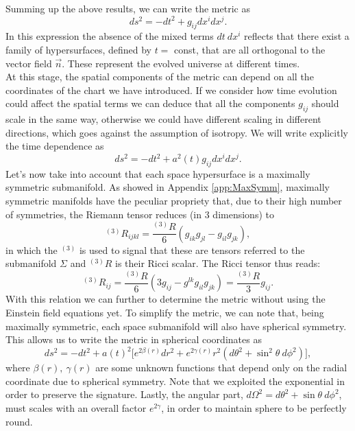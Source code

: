 Summing up the above results, we can write the metric as
\begin{equation*}
    ds^2=-dt^2+g_{ij}dx^i dx^j.
\end{equation*}
In this expression the absence of the mixed terms $dt\ dx^i$ reflects that there exist a family of hypersurfaces, defined by $t=$ const, that are all orthogonal to the vector field $\vec n$. These represent the evolved universe at different times.\\
At this stage, the spatial components of the metric can depend on all the coordinates of the chart we have introduced. If we consider how time evolution could affect the spatial terms we can deduce that all the components $g_{ij}$ should scale in the same way, otherwise we could have different scaling in different directions, which goes against the assumption of isotropy. We will write explicitly the time dependence as
\begin{equation*}
    ds^2=-dt^2+a^2(t)g_{ij}dx^i dx^j.
\end{equation*} 
Let's now take into account that each space hypersurface is a maximally symmetric submanifold. 
As showed in Appendix \ref{app:MaxSymm}, maximally symmetric manifolds have the peculiar propriety that, due to their high number of symmetries, the Riemann tensor reduces (in 3 dimensions) to 
\begin{equation*}
    ^{(3)}R_{ijkl}=\frac{^{(3)}R}{6}(g_{ik}g_{jl}-g_{il}g_{jk}),
\end{equation*}
in which the $^{(3)}$ is used to signal that these are tensors referred to the submanifold $\Sigma$ and $^{(3)}R$ is their Ricci scalar. The Ricci tensor thus reads:
\begin{equation}\label{maxsymRicci}
    ^{(3)}R_{ij}=\frac{^{(3)}R}{6}(3g_{ij}-g^{lk}g_{il}g_{jk})=\frac{^{(3)}R}{3}g_{ij}.
\end{equation}
With this relation we can further to determine the metric without using the Einstein field equations yet.
To simplify the metric, we can note that, being maximally symmetric, each space submanifold will also have spherical symmetry. This allows us to write the metric in spherical coordinates as
\begin{equation*}
    ds^2=-dt^2+a(t)^2\big[e^{2\beta(r)}dr^2+e^{2\gamma(r)}r^2(d\theta^2+\sin^2\theta\ d\phi^2)\big],
\end{equation*}  
where $\beta(r),\ \gamma(r)$ are some unknown functions that depend only on the radial coordinate due to spherical symmetry. Note that we exploited the exponential in order to preserve the signature. Lastly, the angular part, $d\Omega^2= d\theta^2+\sin\theta\ d\phi^2$, must scales with an overall factor $e^{2\gamma}$, in order to maintain sphere to be perfectly round.\\
